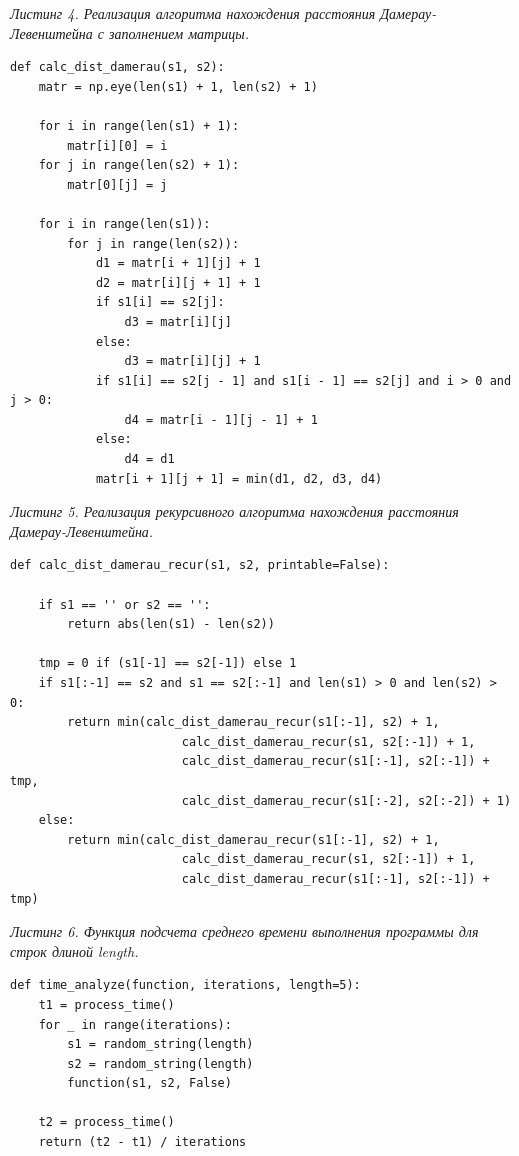 \documentclass[a4paper,12pt]{article}
\begin{document}
\vspace{\baselineskip}

\noindent \textit{Листинг 4. Реализация алгоритма нахождения расстояния Дамерау-Левенштейна с заполнением матрицы.}

\begin{lstlisting}
def calc_dist_damerau(s1, s2):
	matr = np.eye(len(s1) + 1, len(s2) + 1)
	
	for i in range(len(s1) + 1):
		matr[i][0] = i
	for j in range(len(s2) + 1):
		matr[0][j] = j
	
	for i in range(len(s1)):
		for j in range(len(s2)):
			d1 = matr[i + 1][j] + 1
			d2 = matr[i][j + 1] + 1
			if s1[i] == s2[j]:
				d3 = matr[i][j]
			else:
				d3 = matr[i][j] + 1
			if s1[i] == s2[j - 1] and s1[i - 1] == s2[j] and i > 0 and j > 0:
				d4 = matr[i - 1][j - 1] + 1
			else:
				d4 = d1
			matr[i + 1][j + 1] = min(d1, d2, d3, d4)
\end{lstlisting}

\clearpage

\noindent \textit{Листинг 5. Реализация рекурсивного алгоритма нахождения расстояния Дамерау-Левенштейна.}

\begin{lstlisting}
def calc_dist_damerau_recur(s1, s2, printable=False):

	if s1 == '' or s2 == '':
		return abs(len(s1) - len(s2))

	tmp = 0 if (s1[-1] == s2[-1]) else 1
	if s1[:-1] == s2 and s1 == s2[:-1] and len(s1) > 0 and len(s2) > 0:
		return min(calc_dist_damerau_recur(s1[:-1], s2) + 1,
						calc_dist_damerau_recur(s1, s2[:-1]) + 1,
						calc_dist_damerau_recur(s1[:-1], s2[:-1]) + tmp,
						calc_dist_damerau_recur(s1[:-2], s2[:-2]) + 1)
	else:
		return min(calc_dist_damerau_recur(s1[:-1], s2) + 1,
						calc_dist_damerau_recur(s1, s2[:-1]) + 1,
						calc_dist_damerau_recur(s1[:-1], s2[:-1]) + tmp)

\end{lstlisting}

\noindent \textit{Листинг 6. Функция подсчета среднего времени выполнения программы для строк длиной length.}

\begin{lstlisting}
def time_analyze(function, iterations, length=5):
	t1 = process_time()
	for _ in range(iterations):
		s1 = random_string(length)
		s2 = random_string(length)
		function(s1, s2, False)
	
	t2 = process_time()
	return (t2 - t1) / iterations
\end{lstlisting}
\end{document}
